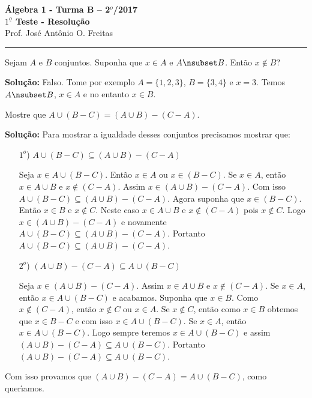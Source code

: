 \documentclass[12pt]{article}
\begin{document}


\begin{center}
{\Large\bf {\'A}lgebra 1 - Turma B -- 2$^{o}$/2017} \\ \vspace{9pt} {\large\bf
  $1^{\underline{o}}$ Teste - Resolu\c{c}\~ao}\\
\vspace{9pt} Prof. Jos{\'e} Ant{\^o}nio O. Freitas
\end{center}
\hrule

\vspace{.6cm}


\vspace{.6cm}

\questao Sejam $A$ e $B$ conjuntos. Suponha que $x \in A$ e $A \nsub B$. Então $x \notin B$?

\noindent\textbf{Solu\c{c}\~ao:} Falso. Tome por exemplo $A = \{1,2,3\}$, $B = \{3,4\}$ e $x = 3$. Temos $A \nsub B$, $x \in A$ e no entanto $x \in B$.

\vspace{.5cm}

\questao Mostre que $A \cup ( B - C) = (A \cup B) - (C - A)$.

\noindent\textbf{Solu\c{c}\~ao:} Para mostrar a igualdade desses conjuntos precisamos mostrar que:
\begin{enumerate}
	\item [$1^o$)] $A \cup ( B - C) \subseteq (A \cup B) - (C - A)$

	Seja $x \in A \cup (B - C)$. Ent\~ao $x \in A$ ou $x \in (B - C)$. Se $x \in A$, ent\~ao $x \in A \cup B$ e $x \notin (C - A)$. Assim $x \in (A \cup B) - (C - A)$. Com isso $A \cup ( B - C) \subseteq (A \cup B) - (C - A)$. Agora suponha que $x \in (B - C)$. Ent\~ao $x \in B$ e $x \notin C$. Neste caso $x \in A \cup B$ e $x \notin (C - A)$ pois $x \notin C$. Logo $x \in (A \cup B) - (C - A)$ e novamente $A \cup ( B - C) \subseteq (A \cup B) - (C - A)$. Portanto $A \cup ( B - C) \subseteq (A \cup B) - (C - A)$.

	\item [$2^o$)] $(A \cup B) - (C - A) \subseteq A \cup ( B - C)$

	Seja $x \in (A \cup B) - (C - A)$. Assim $x \in A \cup B$ e $x \notin (C - A)$. Se $x \in A$, ent\~ao $x \in A \cup (B - C)$ e acabamos. Suponha que $x \in B$. Como $x \notin (C - A)$, ent\~ao $x \notin C$ ou $x \in A$. Se $x \notin C$, ent\~ao como $x \in B$ obtemos que $x \in B - C$ e com isso $x \in A \cup (B - C)$. Se $x \in A$, ent\~ao $x \in A \cup (B - C)$. Logo sempre teremos $x \in A \cup (B - C)$ e assim $(A \cup B) - (C - A) \subseteq A \cup ( B - C)$. Portanto $(A \cup B) - (C - A) \subseteq A \cup ( B - C)$.
\end{enumerate}
Com isso provamos que $(A \cup B) - (C - A) = A \cup ( B - C)$, como quer{\'\i}amos.
\end{document}
